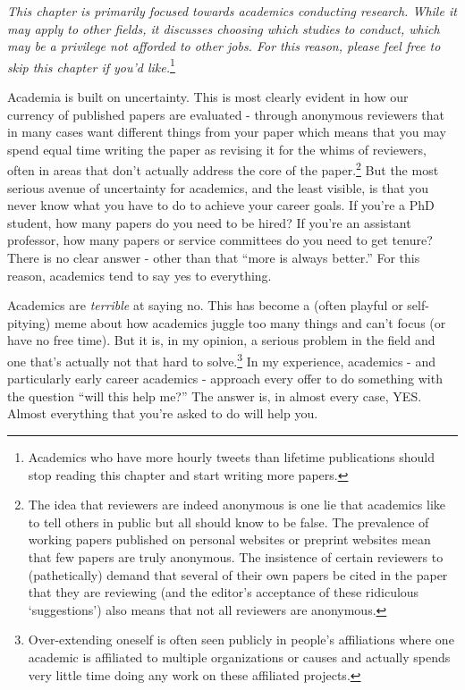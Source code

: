 \documentclass[
  12pt,
  openany]{book}
\begin{document}
\emph{This chapter is primarily focused towards academics conducting research. While it may apply to other fields, it discusses choosing which studies to conduct, which may be a privilege not afforded to other jobs. For this reason, please feel free to skip this chapter if you'd like.}\footnote{Academics who have more hourly tweets than lifetime publications should stop reading this chapter and start writing more papers.}

Academia is built on uncertainty. This is most clearly evident in how our currency of published papers are evaluated - through anonymous reviewers that in many cases want different things from your paper which means that you may spend equal time writing the paper as revising it for the whims of reviewers, often in areas that don't actually address the core of the paper.\footnote{The idea that reviewers are indeed anonymous is one lie that academics like to tell others in public but all should know to be false. The prevalence of working papers published on personal websites or preprint websites mean that few papers are truly anonymous. The insistence of certain reviewers to (pathetically) demand that several of their own papers be cited in the paper that they are reviewing (and the editor's acceptance of these ridiculous `suggestions') also means that not all reviewers are anonymous.} But the most serious avenue of uncertainty for academics, and the least visible, is that you never know what you have to do to achieve your career goals. If you're a PhD student, how many papers do you need to be hired? If you're an assistant professor, how many papers or service committees do you need to get tenure? There is no clear answer - other than that ``more is always better.'' For this reason, academics tend to say yes to everything.

Academics are \emph{terrible} at saying no. This has become a (often playful or self-pitying) meme about how academics juggle too many things and can't focus (or have no free time). But it is, in my opinion, a serious problem in the field and one that's actually not that hard to solve.\footnote{Over-extending oneself is often seen publicly in people's affiliations where one academic is affiliated to multiple organizations or causes and actually spends very little time doing any work on these affiliated projects.} In my experience, academics - and particularly early career academics - approach every offer to do something with the question ``will this help me?'' The answer is, in almost every case, YES. Almost everything that you're asked to do will help you.
\end{document}
